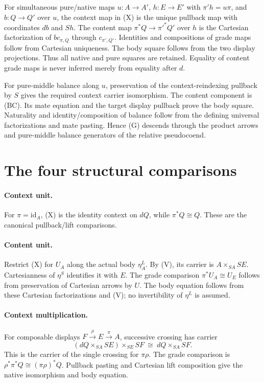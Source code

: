 \documentclass[11pt]{article}
\begin{document}
For simultaneous pure/native maps $u:A\to A'$, $h:E\to E'$ with $\pi'h=u\pi$, and $b:Q\to Q'$ over $u$, the context map in (X) is the unique pullback map with coordinates $db$ and $Sh$. The content map $\pi^*Q\to\pi'^*Q'$ over $h$ is the Cartesian factorization of $b c_{\pi,Q}$ through $c_{\pi',Q'}$. Identities and compositions of grade maps follow from Cartesian uniqueness. The body square follows from the two display projections. Thus all native and pure squares are retained. Equality of content grade maps is never inferred merely from equality after $d$.

For pure-middle balance along $u$, preservation of the context-reindexing pullback by $S$ gives the required context carrier isomorphism. The content component is (BC). Its mate equation and the target display pullback prove the body square. Naturality and identity/composition of balance follow from the defining universal factorizations and mate pasting. Hence (G) descends through the product arrows and pure-middle balance generators of the relative pseudocoend.

\section{The four structural comparisons}
\paragraph{Context unit.} For $\pi=\mathrm{id}_A$, (X) is the identity context on $dQ$, while $\pi^*Q\cong Q$. These are the canonical pullback/lift comparisons.

\paragraph{Content unit.} Restrict (X) for $U_A$ along the actual body $\eta^L_A$. By (V), its carrier is $A\times_{SA}SE$. Cartesianness of $\eta^S$ identifies it with $E$. The grade comparison $\pi^*U_A\cong U_E$ follows from preservation of Cartesian arrows by $U$. The body equation follows from these Cartesian factorizations and (V); no invertibility of $\eta^L$ is assumed.

\paragraph{Context multiplication.} For composable displays $F\xrightarrow\rho E\xrightarrow\pi A$, successive crossing has carrier
\[
 (dQ\times_{SA}SE)\times_{SE}SF\ \cong\ dQ\times_{SA}SF.
\]
This is the carrier of the single crossing for $\pi\rho$. The grade comparison is $\rho^*\pi^*Q\cong(\pi\rho)^*Q$. Pullback pasting and Cartesian lift composition give the native isomorphism and body equation.
\end{document}
